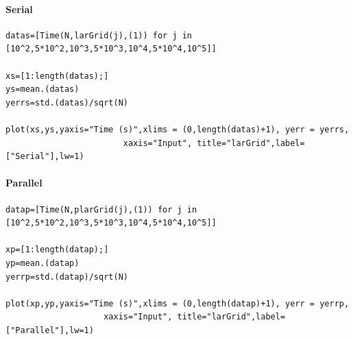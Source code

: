 \documentclass{article}
\begin{document}
\paragraph{Serial}
\begin{flushleft}\small
\begin{list}{}{} \item
    \begin{Verbatim}[tabsize=4]
datas=[Time(N,larGrid(j),(1)) for j in [10^2,5*10^2,10^3,5*10^3,10^4,5*10^4,10^5]]

xs=[1:length(datas);]
ys=mean.(datas)
yerrs=std.(datas)/sqrt(N)

plot(xs,ys,yaxis="Time (s)",xlims = (0,length(datas)+1), yerr = yerrs,
                        xaxis="Input", title="larGrid",label=["Serial"],lw=1)
    \end{Verbatim}
\end{list}
\end{flushleft} 

\paragraph{Parallel}
\begin{flushleft}\small
\begin{list}{}{} \item
    \begin{Verbatim}[tabsize=4]
datap=[Time(N,plarGrid(j),(1)) for j in [10^2,5*10^2,10^3,5*10^3,10^4,5*10^4,10^5]]

xp=[1:length(datap);]
yp=mean.(datap)
yerrp=std.(datap)/sqrt(N)

plot(xp,yp,yaxis="Time (s)",xlims = (0,length(datap)+1), yerr = yerrp,
                    xaxis="Input", title="larGrid",label=["Parallel"],lw=1)
    \end{Verbatim}
\end{list}
\end{flushleft}  
\end{document}
